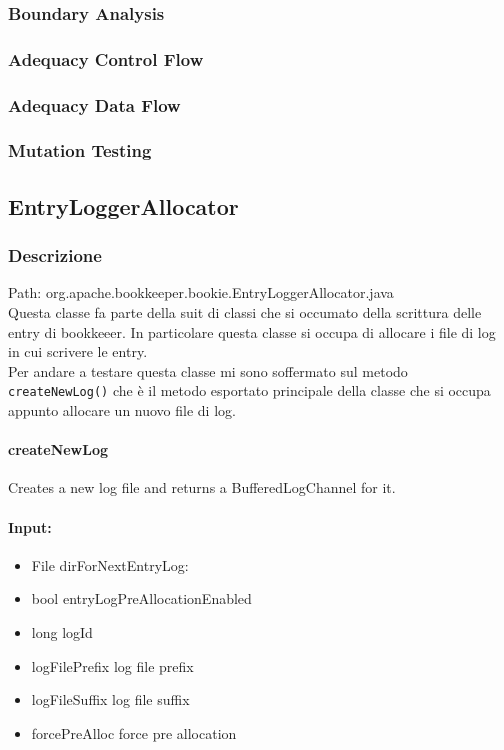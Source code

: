 \documentclass[12pt, a4paper]{article}
\begin{document}
\subsubsection{Boundary Analysis}
\subsubsection{Adequacy Control Flow}
\subsubsection{Adequacy Data Flow}
\subsubsection{Mutation Testing}


\subsection{EntryLoggerAllocator}
\subsubsection{Descrizione}
Path: org.apache.bookkeeper.bookie.EntryLoggerAllocator.java \\

Questa classe fa parte della suit di classi che si occumato della scrittura 
delle entry di bookkeeer. In particolare questa classe si occupa di allocare
i file di log in cui scrivere le entry. \\
Per andare a testare questa classe mi sono soffermato sul metodo \texttt{createNewLog()} che è il metodo esportato
principale della classe che si occupa appunto allocare un nuovo file di log. \\

\paragraph{createNewLog}
Creates a new log file and returns a BufferedLogChannel for it.

\paragraph{Input:}
\begin{itemize}
  \item File dirForNextEntryLog: 
  \item bool entryLogPreAllocationEnabled
  \item long logId
  \item logFilePrefix log file prefix
  \item logFileSuffix log file suffix
  \item forcePreAlloc force pre allocation
\end{itemize}
\end{document}
